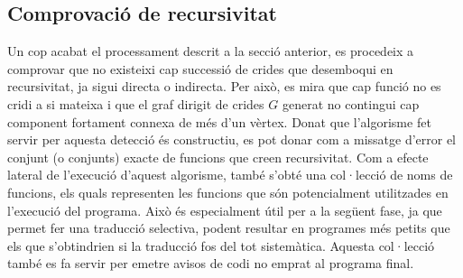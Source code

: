 \subsection{Comprovació de recursivitat}

Un cop acabat el processament descrit a la secció anterior, es procedeix a 
comprovar que no existeixi cap successió de crides que desemboqui en 
recursivitat, ja sigui directa o indirecta. Per això, es mira que cap funció 
no es cridi a si mateixa i que el graf dirigit de crides $G$ generat no 
contingui cap component fortament connexa de més d'un vèrtex. Donat que 
l'algorisme fet servir per aquesta detecció és constructiu, es pot donar com a 
missatge d'error el conjunt (o conjunts) exacte de funcions que creen 
recursivitat. Com a efecte lateral de l'execució d'aquest algorisme, també 
s'obté una col·lecció de noms de funcions, els quals representen les funcions 
que són potencialment utilitzades en l'execució del programa. Això és 
especialment útil per a la següent fase, ja que permet fer una traducció 
selectiva, podent resultar en programes més petits que els que s'obtindrien si 
la traducció fos del tot sistemàtica. Aquesta col·lecció també es fa servir per 
emetre avisos de codi no emprat al programa final.


